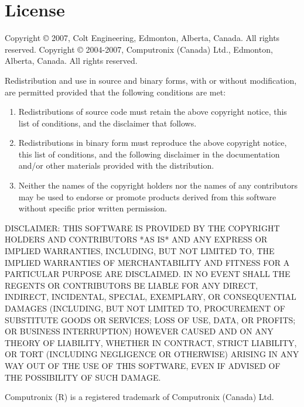 \chapter{License}\label{license}

\centerline{}

Copyright \copyright{} 2007, Colt Engineering, Edmonton, Alberta, Canada.
All rights reserved.\break
Copyright \copyright{} 2004-2007, Computronix (Canada) Ltd., Edmonton,
Alberta, Canada.
All rights reserved.

Redistribution and use in source and binary forms, with or without
modification, are permitted provided that the following conditions are met:

\begin{enumerate}
\item
    Redistributions of source code must retain the above copyright notice,
    this list of conditions, and the disclaimer that follows.

\item
    Redistributions in binary form must reproduce the above copyright
    notice, this list of conditions, and the following disclaimer in the
    documentation and/or other materials provided with the distribution.

\item
    Neither the names of the copyright holders nor the names of any
    contributors may be used to endorse or promote products derived from this
    software without specific prior written permission.
\end{enumerate}

DISCLAIMER:
THIS SOFTWARE IS PROVIDED BY THE COPYRIGHT HOLDERS AND CONTRIBUTORS *AS IS*
AND ANY EXPRESS OR IMPLIED WARRANTIES, INCLUDING, BUT NOT LIMITED TO,
THE IMPLIED WARRANTIES OF MERCHANTABILITY AND FITNESS FOR A
PARTICULAR PURPOSE ARE DISCLAIMED. IN NO EVENT SHALL THE REGENTS
OR CONTRIBUTORS BE LIABLE FOR ANY DIRECT, INDIRECT, INCIDENTAL,
SPECIAL, EXEMPLARY, OR CONSEQUENTIAL DAMAGES (INCLUDING, BUT NOT
LIMITED TO, PROCUREMENT OF SUBSTITUTE GOODS OR SERVICES; LOSS OF
USE, DATA, OR PROFITS; OR BUSINESS INTERRUPTION) HOWEVER CAUSED
AND ON ANY THEORY OF LIABILITY, WHETHER IN CONTRACT, STRICT LIABILITY,
OR TORT (INCLUDING NEGLIGENCE OR OTHERWISE) ARISING IN ANY WAY OUT
OF THE USE OF THIS SOFTWARE, EVEN IF ADVISED OF THE POSSIBILITY OF
SUCH DAMAGE.

Computronix (R) is a registered trademark of Computronix (Canada) Ltd.

